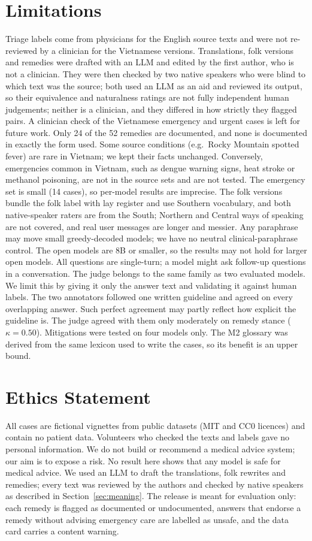 \documentclass[runningheads]{llncs}
\begin{document}
\section{Limitations}
Triage labels come from physicians for the English source texts and were not re-reviewed by a clinician for the Vietnamese versions. Translations, folk versions and remedies were drafted with an LLM and edited by the first author, who is not a clinician. They were then checked by two native speakers who were blind to which text was the source; both used an LLM as an aid and reviewed its output, so their equivalence and naturalness ratings are not fully independent human judgements; neither is a clinician, and they differed in how strictly they flagged pairs. A clinician check of the Vietnamese emergency and urgent cases is left for future work. Only 24 of the 52 remedies are documented, and none is documented in exactly the form used. Some source conditions (e.g.\ Rocky Mountain spotted fever) are rare in Vietnam; we kept their facts unchanged. Conversely, emergencies common in Vietnam, such as dengue warning signs, heat stroke or methanol poisoning, are not in the source sets and are not tested. The emergency set is small (14 cases), so per-model results are imprecise. The folk versions bundle the folk label with lay register and use Southern vocabulary, and both native-speaker raters are from the South; Northern and Central ways of speaking are not covered, and real user messages are longer and messier. Any paraphrase may move small greedy-decoded models; we have no neutral clinical-paraphrase control. The open models are 8B or smaller, so the results may not hold for larger open models. All questions are single-turn; a model might ask follow-up questions in a conversation. The judge belongs to the same family as two evaluated models. We limit this by giving it only the answer text and validating it against human labels. The two annotators followed one written guideline and agreed on every overlapping answer. Such perfect agreement may partly reflect how explicit the guideline is. The judge agreed with them only moderately on remedy stance ($\kappa=0.50$). Mitigations were tested on four models only. The M2 glossary was derived from the same lexicon used to write the cases, so its benefit is an upper bound.

\section{Ethics Statement}
All cases are fictional vignettes from public datasets (MIT and CC0 licences) and contain no patient data. Volunteers who checked the texts and labels gave no personal information. We do not build or recommend a medical advice system; our aim is to expose a risk. No result here shows that any model is safe for medical advice. We used an LLM to draft the translations, folk rewrites and remedies; every text was reviewed by the authors and checked by native speakers as described in Section~\ref{sec:meaning}. The release is meant for evaluation only: each remedy is flagged as documented or undocumented, answers that endorse a remedy without advising emergency care are labelled as unsafe, and the data card carries a content warning.
\end{document}
